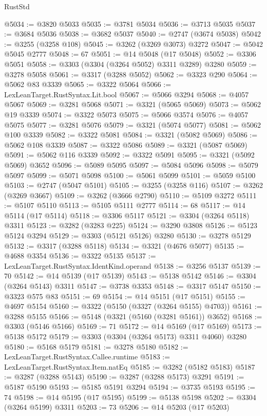 \begin{lexlean}{RustStd}
\begin{coremodule}
{\begin{coremodule}
{{{{{{{{{{{{{{{{{{{{{{{{{{{{{{{{{@5034 := @3820 @5033
@5035 := @3781 @5034
@5036 := @3713 @5035
@5037 := @3684 @5036
@5038 := @3682 @5037
@5040 := @2747 (@3674 @5038)
@5042 := @3255 (@3258 @108)
@5045 := @3262 (@3269 @3073) @3272
@5047 := @5042 @5045 @2777
@5048 := 67
@5051 := @14 @5048 (@17 @5048)
@5052 := @3306 @5051
@5058 := @3303 (@3304 (@3264 @5052) @3311 @3289) @3280
@5059 := @3278 @5058
@5061 := @3317 (@3288 @5052)
@5062 := @3323 @290
@5064 := @5062 @83 @3339
@5065 := @3322 @5064
@5066 := LexLeanTarget.RustSyntax.Lit.bool
@5067 := @5066 @3294
@5068 := @4057 @5067
@5069 := @3281 @5068
@5071 := @3321 (@5065 @5069)
@5073 := @5062 @19 @3339
@5074 := @3322 @5073
@5075 := @5066 @3574
@5076 := @4057 @5075
@5077 := @3281 @5076
@5079 := @3321 (@5074 @5077)
@5081 := @5062 @100 @3339
@5082 := @3322 @5081
@5084 := @3321 (@5082 @5069)
@5086 := @5062 @108 @3339
@5087 := @3322 @5086
@5089 := @3321 (@5087 @5069)
@5091 := @5062 @116 @3339
@5092 := @3322 @5091
@5095 := @3321 (@5092 @5069) @3652
@5096 := @5089 @5095
@5097 := @5084 @5096
@5098 := @5079 @5097
@5099 := @5071 @5098
@5100 := @5061 @5099
@5101 := @5059 @5100
@5103 := @2747 (@5047 @5101)
@5105 := @3255 (@3258 @116)
@5107 := @3262 (@3269 @3667)
@5109 := @3262 (@3666 @2790)
@5110 := @5109 @3272
@5111 := @5107 @5110
@5113 := @5105 @5111 @2777
@5114 := 68
@5117 := @14 @5114 (@17 @5114)
@5118 := @3306 @5117
@5121 := @3304 (@3264 @5118) @3311
@5123 := @3282 (@3283 @225)
@5124 := @3290 @3808
@5126 := @5123 @5124 @3294
@5129 := @3303 (@5121 @5126) @3280
@5130 := @3278 @5129
@5132 := @3317 (@3288 @5118)
@5134 := @3321 (@4676 @5077)
@5135 := @4688 @3354
@5136 := @3322 @5135
@5137 := LexLeanTarget.RustSyntax.IdentKind.operand
@5138 := @3256 @5137
@5139 := 70
@5142 := @14 @5139 (@17 @5139)
@5143 := @5138 @5142
@5146 := @3304 (@3264 @5143) @3311
@5147 := @3738 @3353
@5148 := @3317 @5147
@5150 := @3323 @575 @83
@5151 := 69
@5154 := @14 @5151 (@17 @5151)
@5155 := @4697 @5154
@5160 := @3322 (@5150 (@3327 (@3264 @5155) @4703))
@5161 := @3288 @5155
@5166 := @5148 (@3321 (@5160 (@3281 @5161)) @3652)
@5168 := @3303 (@5146 @5166)
@5169 := 71
@5172 := @14 @5169 (@17 @5169)
@5173 := @5138 @5172
@5179 := @3303 (@3304 (@3264 @5173) @3311 @4060) @3280
@5180 := @5168 @5179
@5181 := @3278 @5180
@5182 := LexLeanTarget.RustSyntax.Callee.runtime
@5183 := LexLeanTarget.RustSyntax.Item.natEq
@5185 := @3282 (@5182 @5183)
@5187 := @3287 (@3288 @5143)
@5190 := @3287 (@3288 @5173) @3291
@5191 := @5187 @5190
@5193 := @5185 @5191 @3294
@5194 := @3735 @5193
@5195 := 74
@5198 := @14 @5195 (@17 @5195)
@5199 := @5138 @5198
@5202 := @3304 (@3264 @5199) @3311
@5203 := 73
@5206 := @14 @5203 (@17 @5203)
}}}}}}}}}}}}}}}}}}}}}}}}}}}}}}}}}
\end{coremodule}}
\end{coremodule}
\end{lexlean}
